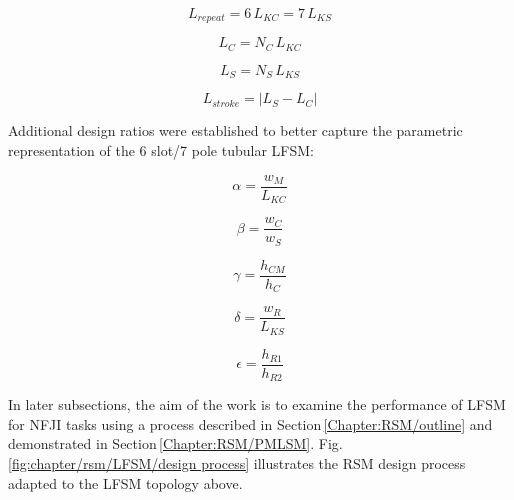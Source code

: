         
        \begin{equation}
            L_{repeat}=6\,L_{KC}=7\,L_{KS}
            \label{eq:chap/rsm/LFSM/L_repeat,LKC,LKS}
        \end{equation}
        
        \begin{equation}
            L_{C}=N_C\,L_{KC}
            \label{eq:chap/rsm/LFSM/L_C}
        \end{equation}
        
        \begin{equation}
            L_{S}=N_S\,L_{KS}
            \label{eq:chap/rsm/LFSM/L_S}
        \end{equation}
        
        
        \begin{equation}
            L_{stroke}= \big| L_S-L_C \big|
            \label{eq:chap/rsm/LFSM/L_stroke}
        \end{equation}
        
        
        Additional design ratios were established to better capture the parametric representation of the 6 slot/7 pole tubular \acs{LFSM}:
        
        
        \begin{equation}
            \alpha=\frac{w_M}{L_{KC}}
            \label{eq:chap/rsm/LFSM/alpha}
        \end{equation}
        
        
        \begin{equation}
            \beta=\frac{w_C}{w_S}
            \label{eq:chap/rsm/LFSM/beta}
        \end{equation}
        
        
        \begin{equation}
            \gamma=\frac{h_{CM}}{h_C}
            \label{eq:chap/rsm/LFSM/gamma}
        \end{equation}
        
        
        \begin{equation}
            \delta=\frac{w_R}{L_{KS}}
            \label{eq:chap/rsm/LFSM/delta}
        \end{equation}
        
        
        \begin{equation}
            \epsilon=\frac{h_{R1}}{h_{R2}}
            \label{eq:chap/rsm/LFSM/epsilon}
        \end{equation}

    
        In later subsections, the aim of the work is to examine the performance of \acs{LFSM} for \acs{NFJI} tasks using a process described in Section\,\ref{Chapter:RSM/outline} and demonstrated in Section\,\ref{Chapter:RSM/PMLSM}. Fig.\,\ref{fig:chapter/rsm/LFSM/design process} illustrates the \acs{RSM} design process adapted to the \acs{LFSM} topology above. 
    
